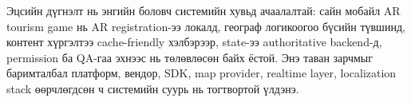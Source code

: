 \begin{sloppy}
Эцсийн дүгнэлт нь энгийн боловч системийн хувьд ачаалалтай: сайн мобайл AR tourism game нь AR registration-ээ локалд, географ логикоогоо бүсийн түвшинд, контент хүргэлтээ cache-friendly хэлбэрээр, state-ээ authoritative backend-д, permission ба QA-гаа эхнээс нь төлөвлөсөн байх ёстой. Энэ таван зарчмыг баримталбал платформ, вендор, SDK, map provider, realtime layer, localization stack өөрчлөгдсөн ч системийн суурь нь тогтвортой үлдэнэ.

\end{sloppy}
